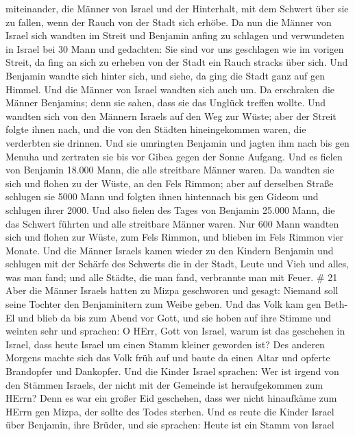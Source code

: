 miteinander, die Männer von Israel und der Hinterhalt, mit dem Schwert
über sie zu fallen, wenn der Rauch von der Stadt sich erhöbe.
 Da nun die Männer von Israel sich wandten im Streit und
Benjamin anfing zu schlagen und verwundeten in Israel bei 30 Mann und
gedachten: Sie sind vor uns geschlagen wie im vorigen Streit,
 da fing an sich zu erheben von der Stadt ein Rauch stracks
über sich. Und Benjamin wandte sich hinter sich, und siehe, da ging die
Stadt ganz auf gen Himmel.  Und die Männer von Israel
wandten sich auch um. Da erschraken die Männer Benjamins; denn sie
sahen, dass sie das Unglück treffen wollte.  Und wandten
sich von den Männern Israels auf den Weg zur Wüste; aber der Streit
folgte ihnen nach, und die von den Städten hineingekommen waren, die
verderbten sie drinnen.  Und sie umringten Benjamin und
jagten ihm nach bis gen Menuha und zertraten sie bis vor Gibea gegen der
Sonne Aufgang.  Und es fielen von Benjamin 18.000 Mann, die
alle streitbare Männer waren.  Da wandten sie sich und
flohen zu der Wüste, an den Fels Rimmon; aber auf derselben Straße
schlugen sie 5000 Mann und folgten ihnen hintennach bis gen Gideom und
schlugen ihrer 2000.  Und also fielen des Tages von
Benjamin 25.000 Mann, die das Schwert führten und alle streitbare Männer
waren.  Nur 600 Mann wandten sich und flohen zur Wüste, zum
Fels Rimmon, und blieben im Fels Rimmon vier Monate.  Und
die Männer Israels kamen wieder zu den Kindern Benjamin und schlugen mit
der Schärfe des Schwerts die in der Stadt, Leute und Vieh und alles, was
man fand; und alle Städte, die man fand, verbrannte man mit Feuer. \# 21
 Aber die Männer Israels hatten zu Mizpa geschworen und
gesagt: Niemand soll seine Tochter den Benjaminitern zum Weibe geben.
 Und das Volk kam gen Beth-El und blieb da bis zum Abend vor
Gott, und sie hoben auf ihre Stimme und weinten sehr  und
sprachen: O HErr, Gott von Israel, warum ist das geschehen in Israel,
dass heute Israel um einen Stamm kleiner geworden ist?  Des
anderen Morgens machte sich das Volk früh auf und baute da einen Altar
und opferte Brandopfer und Dankopfer.  Und die Kinder Israel
sprachen: Wer ist irgend von den Stämmen Israels, der nicht mit der
Gemeinde ist heraufgekommen zum HErrn? Denn es war ein großer Eid
geschehen, dass wer nicht hinaufkäme zum HErrn gen Mizpa, der sollte des
Todes sterben.  Und es reute die Kinder Israel über
Benjamin, ihre Brüder, und sie sprachen: Heute ist ein Stamm von Israel
